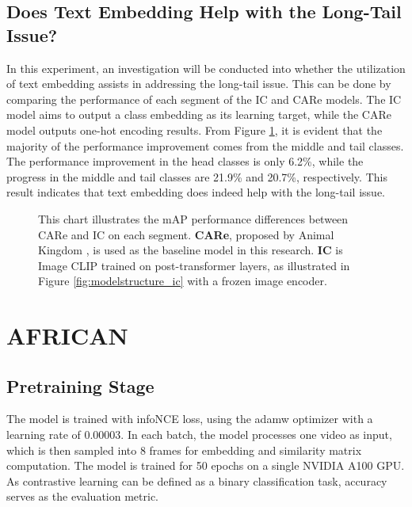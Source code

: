\subsection{Does Text Embedding Help with the Long-Tail Issue?}
In this experiment, an investigation will be conducted into whether the utilization of text embedding assists in addressing the long-tail issue. This can be done by comparing the performance of each segment of the IC and CARe models. The IC model aims to output a class embedding as its learning target, while the CARe model outputs one-hot encoding results. From Figure \ref{fig:tp_longtailcomp}, it is evident that the majority of the performance improvement comes from the middle and tail classes. The performance improvement in the head classes is only 6.2\%, while the progress in the middle and tail classes are 21.9\% and 20.7\%, respectively. This result indicates that text embedding does indeed help with the long-tail issue. 

\begin{figure}[ht]
    \centering
    \resizebox{0.75\textwidth}{!}{}
    \caption[mAP Performance Differences between CARe and IC on each Segment]{This chart illustrates the mAP performance differences between CARe and IC on each segment. \textbf{CARe}, proposed by Animal Kingdom \parencite{ng2022animal}, is used as the baseline model in this research. \textbf{IC} is Image CLIP trained on post-transformer layers, as illustrated in Figure \ref{fig:modelstructure_ic} with a frozen image encoder.}
    \label{fig:tp_longtailcomp}
\end{figure}



\section{AFRICAN}
\subsection{Pretraining Stage}
The model is trained with infoNCE \parencite{oord2019representation} loss, using the adamw optimizer with a learning rate of 0.00003. In each batch, the model processes one video as input, which is then sampled into 8 frames for embedding and similarity matrix computation. The model is trained for 50 epochs on a single NVIDIA A100 GPU. As contrastive learning can be defined as a binary classification task, accuracy serves as the evaluation metric.

